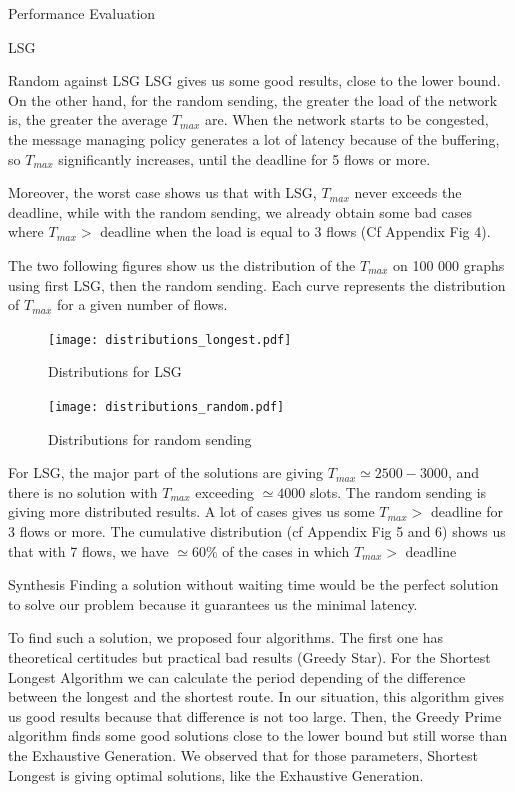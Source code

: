 \documentclass[a4paper,10pt]{report}
\begin{document}
\begin{chapter}{Performance Evaluation}
\begin{section}{LSG}
\begin{subsection}{Random against LSG}
LSG gives us some good results, close to the lower bound. On the other hand, for the random sending, 
the greater the load of the network is, the greater the average $T_{max}$ are. When the network starts to be congested, the 
message managing policy generates a lot of latency because of the buffering, so $T_{max}$ significantly increases, until the deadline for 5 flows or more.


Moreover, the worst case shows us that with LSG, $T_{max}$ never exceeds the deadline, while with the random sending, we already obtain some bad cases where $T_{max} > $ deadline when the load is equal to 3 flows (Cf Appendix Fig 4).


The two following figures show us the distribution of the $T_{max}$ on 100 000 graphs using first LSG, then the
random sending.
Each curve represents the distribution of $T_{max}$ for a given number of flows.
\begin{figure}[H]
\hspace*{-4cm}
\centering
\texttt{[image: distributions\_longest.pdf]}%
\caption{Distributions for LSG}
\end{figure}

\begin{figure}[H]
\hspace*{-3cm}
\centering
\texttt{[image: distributions\_random.pdf]}%
\caption{Distributions for random sending}
\end{figure}

For LSG, the major part of the solutions are giving $T_{max} \simeq 2500-3000$, and there is no
solution with $T_{max}$ exceeding $\simeq 4000$ slots.
The random sending is giving more distributed results. A lot of cases gives us some $T_{max} >$ deadline for 3 flows or more.
The cumulative distribution (cf Appendix Fig 5 and 6) shows us that with 7 flows, we have $\simeq 60\%$ of the cases in which $T_{max} >$ deadline


\end{subsection}

\end{section}

\begin{section}{Synthesis}
Finding a solution without waiting time would be the perfect solution to solve our problem because it guarantees us the minimal latency.

To find such a solution, we proposed four algorithms. The first one has theoretical certitudes but practical bad results (Greedy Star).
For the Shortest Longest Algorithm we can calculate the period depending of the difference between the longest and the shortest route.
In our situation, this algorithm gives us good results because that difference is not too large.
Then, the Greedy Prime algorithm finds some good solutions close to the lower bound but still worse than the Exhaustive Generation.
We observed that for those parameters, Shortest Longest is giving optimal solutions, like the Exhaustive Generation.


\end{section}
\end{chapter}
\end{document}

